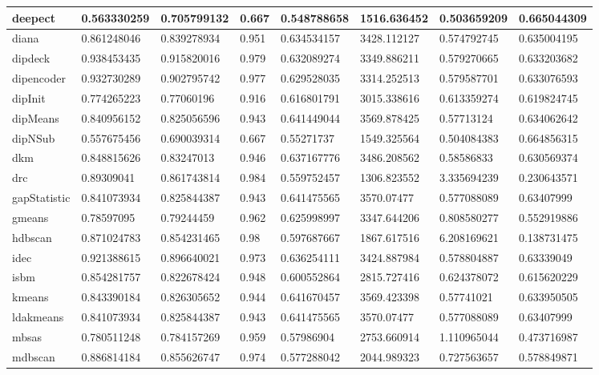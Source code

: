 \begin{table}[H]
\begin{tabular}{|l|l|l|l|l|l|l|l|}
\hline
deepect & 0.563330259 & 0.705799132 & 0.667 & 0.548788658 & 1516.636452 & 0.503659209 & 0.665044309 \\
\hline
diana & 0.861248046 & 0.839278934 & 0.951 & 0.634534157 & 3428.112127 & 0.574792745 & 0.635004195 \\
\hline
dipdeck & 0.938453435 & 0.915820016 & 0.979 & 0.632089274 & 3349.886211 & 0.579270665 & 0.633203682 \\
\hline
dipencoder & 0.932730289 & 0.902795742 & 0.977 & 0.629528035 & 3314.252513 & 0.579587701 & 0.633076593 \\
\hline
dipInit & 0.774265223 & 0.77060196 & 0.916 & 0.616801791 & 3015.338616 & 0.613359274 & 0.619824745 \\
\hline
dipMeans & 0.840956152 & 0.825056596 & 0.943 & 0.641449044 & 3569.878425 & 0.57713124 & 0.634062642 \\
\hline
dipNSub & 0.557675456 & 0.690039314 & 0.667 & 0.55271737 & 1549.325564 & 0.504084383 & 0.664856315 \\
\hline
dkm & 0.848815626 & 0.83247013 & 0.946 & 0.637167776 & 3486.208562 & 0.58586833 & 0.630569374 \\
\hline
drc & 0.89309041 & 0.861743814 & 0.984 & 0.559752457 & 1306.823552 & 3.335694239 & 0.230643571 \\
\hline
gapStatistic & 0.841073934 & 0.825844387 & 0.943 & 0.641475565 & 3570.07477 & 0.577088089 & 0.63407999 \\
\hline
gmeans & 0.78597095 & 0.79244459 & 0.962 & 0.625998997 & 3347.644206 & 0.808580277 & 0.552919886 \\
\hline
hdbscan & 0.871024783 & 0.854231465 & 0.98 & 0.597687667 & 1867.617516 & 6.208169621 & 0.138731475 \\
\hline
idec & 0.921388615 & 0.896640021 & 0.973 & 0.636254111 & 3424.887984 & 0.578804887 & 0.63339049 \\
\hline
isbm & 0.854281757 & 0.822678424 & 0.948 & 0.600552864 & 2815.727416 & 0.624378072 & 0.615620229 \\
\hline
kmeans & 0.843390184 & 0.826305652 & 0.944 & 0.641670457 & 3569.423398 & 0.57741021 & 0.633950505 \\
\hline
ldakmeans & 0.841073934 & 0.825844387 & 0.943 & 0.641475565 & 3570.07477 & 0.577088089 & 0.63407999 \\
\hline
mbsas & 0.780511248 & 0.784157269 & 0.959 & 0.57986904 & 2753.660914 & 1.110965044 & 0.473716987 \\
\hline
mdbscan & 0.886814184 & 0.855626747 & 0.974 & 0.577288042 & 2044.989323 & 0.727563657 & 0.578849871 \\

\end{tabular}
\end{table}
